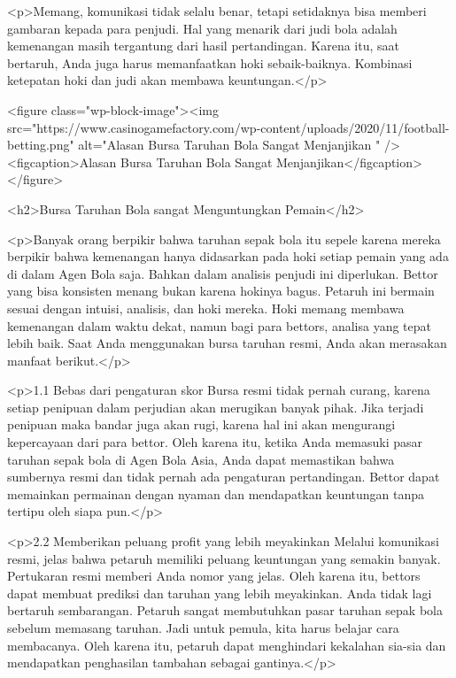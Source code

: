 {<p>Memang, komunikasi tidak selalu benar, tetapi setidaknya bisa memberi gambaran kepada para penjudi. Hal yang menarik dari judi bola adalah kemenangan masih tergantung dari hasil pertandingan. Karena itu, saat bertaruh, Anda juga harus memanfaatkan hoki sebaik-baiknya. Kombinasi ketepatan hoki dan judi akan membawa keuntungan.</p>



<figure class="wp-block-image"><img src="https://www.casinogamefactory.com/wp-content/uploads/2020/11/football-betting.png" alt="Alasan Bursa Taruhan Bola Sangat Menjanjikan  " /><figcaption>Alasan Bursa Taruhan Bola Sangat Menjanjikan</figcaption></figure>



<h2>Bursa Taruhan Bola sangat Menguntungkan Pemain</h2>



<p>Banyak orang berpikir bahwa taruhan sepak bola itu sepele karena mereka berpikir bahwa kemenangan hanya didasarkan pada hoki setiap pemain yang ada di dalam Agen Bola saja. Bahkan dalam analisis penjudi ini diperlukan. Bettor yang bisa konsisten menang bukan karena hokinya bagus. Petaruh ini bermain sesuai dengan intuisi, analisis, dan hoki mereka. Hoki memang membawa kemenangan dalam waktu dekat, namun bagi para bettors, analisa yang tepat lebih baik. Saat Anda menggunakan bursa taruhan resmi, Anda akan merasakan manfaat berikut.</p>



<p>1.1 Bebas dari pengaturan skor Bursa resmi tidak pernah curang, karena setiap penipuan dalam perjudian akan merugikan banyak pihak. Jika terjadi penipuan maka bandar juga akan rugi, karena hal ini akan mengurangi kepercayaan dari para bettor. Oleh karena itu, ketika Anda memasuki pasar taruhan sepak bola di Agen Bola Asia, Anda dapat memastikan bahwa sumbernya resmi dan tidak pernah ada pengaturan pertandingan. Bettor dapat memainkan permainan dengan nyaman dan mendapatkan keuntungan tanpa tertipu oleh siapa pun.</p>



<p>2.2 Memberikan peluang profit yang lebih meyakinkan Melalui komunikasi resmi, jelas bahwa petaruh memiliki peluang keuntungan yang semakin banyak. Pertukaran resmi memberi Anda nomor yang jelas. Oleh karena itu, bettors dapat membuat prediksi dan taruhan yang lebih meyakinkan. Anda tidak lagi bertaruh sembarangan. Petaruh sangat membutuhkan pasar taruhan sepak bola sebelum memasang taruhan. Jadi untuk pemula, kita harus belajar cara membacanya. Oleh karena itu, petaruh dapat menghindari kekalahan sia-sia dan mendapatkan penghasilan tambahan sebagai gantinya.</p>



}
